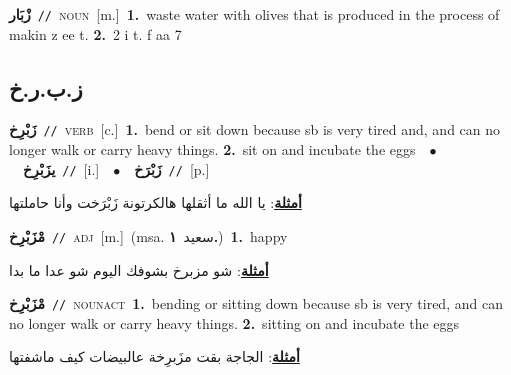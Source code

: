\documentclass[10pt,a4paper,twoside]{article} %
\begin{document}
\begin{multicols}{2}
{{{{{{\setlength\topsep{0pt}\textbf{\foreignlanguage{arabic}{زْبَار}}\ {\color{gray}\texttt{//}\color{black}}\ \textsc{noun}\ [m.]\ \textbf{1.}~waste water with olives that is produced in the process of makin z ee t.  \textbf{2.}~2 i t. f aa 7\ 

\vspace{-3mm}
\subsection*{\color{blue}\foreignlanguage{arabic}{ز.ب.ر.خ}\color{blue}{}} 

{\setlength\topsep{0pt}\textbf{\foreignlanguage{arabic}{زَبْرِخ}}\ {\color{gray}\texttt{//}\color{black}}\ \textsc{verb}\ [c.]\ \textbf{1.}~bend or sit down because sb is very tired and, and can no longer walk or carry heavy things.  \textbf{2.}~sit on and incubate the eggs\ \ $\bullet$\ \ \setlength\topsep{0pt}\textbf{\foreignlanguage{arabic}{يزَبْرِخ}}\ {\color{gray}\texttt{//}\color{black}}\ [i.]\ \ $\bullet$\ \ \setlength\topsep{0pt}\textbf{\foreignlanguage{arabic}{زَبْرَخ}}\ {\color{gray}\texttt{//}\color{black}}\ [p.]\  \begin{flushright}\color{gray}\foreignlanguage{arabic}{\textbf{\underline{\foreignlanguage{arabic}{أمثلة}}}: يا الله ما أثقلها هالكرتونة زَبْرَخت وأنا حاملتها}\end{flushright}\color{black}} \vspace{2mm}

{\setlength\topsep{0pt}\textbf{\foreignlanguage{arabic}{مْزَبْرِخ}}\ {\color{gray}\texttt{//}\color{black}}\ \textsc{adj}\ [m.]\ \color{gray}(msa. \foreignlanguage{arabic}{سعيد}~\foreignlanguage{arabic}{\textbf{١.}})\color{black}\ \textbf{1.}~happy\  \begin{flushright}\color{gray}\foreignlanguage{arabic}{\textbf{\underline{\foreignlanguage{arabic}{أمثلة}}}: شو مزبرخ بشوفك اليوم شو عدا ما بدا}\end{flushright}\color{black}} \vspace{2mm}

{\setlength\topsep{0pt}\textbf{\foreignlanguage{arabic}{مْزَبْرِخ}}\ {\color{gray}\texttt{//}\color{black}}\ \textsc{noun\textunderscore act}\ \textbf{1.}~bending or sitting down because sb is very tired, and can no longer walk or carry heavy things.  \textbf{2.}~sitting on and incubate the eggs\  \begin{flushright}\color{gray}\foreignlanguage{arabic}{\textbf{\underline{\foreignlanguage{arabic}{أمثلة}}}: الجاجة بقت مزَبرِخة عالبيضات كيف ماشفتها}\end{flushright}\color{black}} \vspace{2mm}

}}}}}}
\end{multicols}
\end{document}
